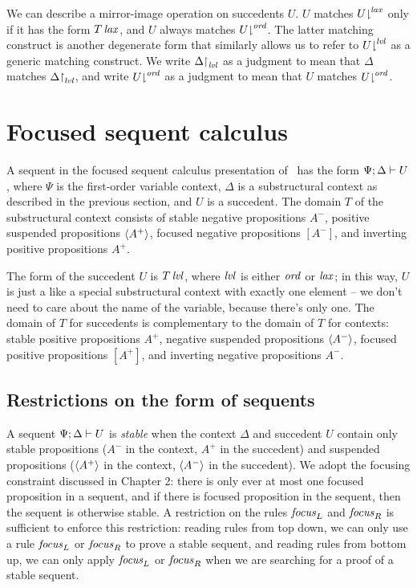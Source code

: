 We can describe a mirror-image operation on succedents $U$.  $U$
matches ${U}{\downharpoonright}^{{\it lax}}$ only if it has the form ${T}\,{{\it lax}}$,
and $U$ always matches ${U}{\downharpoonright}^{{\it ord}}$. The latter matching
construct is another degenerate form that similarly allows us to refer
to ${U}{\downharpoonright}^{{\it lvl}}$ as a generic matching construct. We write
${\Delta}{\upharpoonright}_{{\it lvl}}$ as a judgment to mean that 
$\Delta$ matches ${\Delta}{\upharpoonright}_{{\it lvl}}$, 
and write ${U}{\downharpoonright}^{{\it ord}}$
as a judgment to mean that $U$ matches ${U}{\downharpoonright}^{{\it ord}}$.

\section{Focused sequent calculus}
\label{sec:ord-focused}

A sequent in the focused sequent calculus presentation of \ollll~has
the form ${\Psi};{\Delta} \vdash {U} \mathstrut$, where $\Psi$ is the first-order
variable context, $\Delta$ is a substructural context as described in
the previous section, and $U$ is a succedent. The domain $T$ of the
substructural context consists of stable negative propositions $A^-$,
positive suspended propositions $\langle {A^+} \rangle$, focused negative
propositions $[A^-]$, and inverting positive propositions $A^+$.

The form of the succedent $U$ is ${T}\,{{\it lvl}}$, where ${\it lvl}$ is either
${\it ord}$ or ${\it lax}$; in this way, $U$ is just a like a special
substructural context with exactly one element -- we don't need
to care about the name of the variable, because there's only one.  The
domain of $T$ for succedents is complementary to the domain of $T$
for contexts: stable positive propositions $A^+$, negative suspended
propositions $\langle {A^-} \rangle$, focused positive propositions $[A^+]$, and
inverting negative propositions $A^-$.

\subsection{Restrictions on the form of sequents}

A sequent ${\Psi};{\Delta} \vdash {U} \mathstrut$ is {\it stable} when the context
$\Delta$ and succedent $U$ contain only stable propositions ($A^-$ in
the context, $A^+$ in the succedent) and suspended propositions
($\langle {A^+} \rangle$ in the context, $\langle {A^-} \rangle$ in the succedent). We
adopt the focusing constraint discussed in Chapter 2: there is only
ever at most one focused proposition in a sequent, and if there is
focused proposition in the sequent, then the sequent is otherwise
stable. A restriction on the rules ${\it focus}_L$ and ${\it focus}_R$
is sufficient to enforce this restriction: reading rules from
top down, we can only use a rule ${\it focus}_L$ or ${\it focus}_R$ to
prove a stable sequent, and reading rules from bottom up, we can only
apply ${\it focus}_L$ or ${\it focus}_R$ when we are searching for a
proof of a stable sequent.

